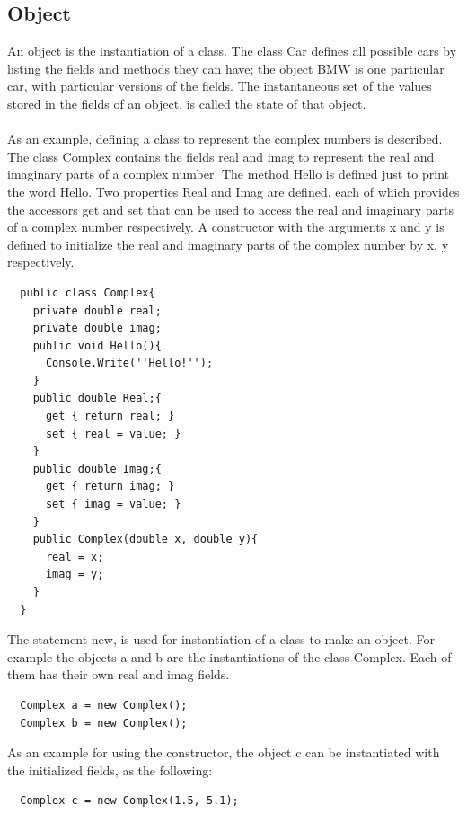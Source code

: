 \documentclass[11pt,twoside,a4paper]{fdyartcl}
\begin{document}
\subsection{Object}
An object is the instantiation of a class. The class {\scriptsize Car} defines all possible cars by listing the fields and methods they can have; the object {\scriptsize BMW} is one particular car, with particular versions of the fields. The instantaneous set of the values stored in the fields of an object, is called the state of that object.
\paragraph{}
As an example, defining a class to represent the complex numbers is described. The class {\scriptsize Complex} contains the fields {\scriptsize real} and {\scriptsize imag} to represent the real and imaginary parts of a complex number. The method {\scriptsize Hello} is defined just to print the word Hello. Two properties {\scriptsize Real} and {\scriptsize Imag} are defined, each of which provides the accessors {\scriptsize get} and {\scriptsize set} that can be used to access the real and imaginary parts of a complex number respectively. A constructor with the arguments {\scriptsize x} and {\scriptsize y} is defined to initialize the real and imaginary parts of the complex number by {\scriptsize x}, {\scriptsize y} respectively.
{\scriptsize \begin{verbatim}
  public class Complex{
    private double real;
    private double imag;
    public void Hello(){
      Console.Write(''Hello!'');
    }
    public double Real;{
      get { return real; }
      set { real = value; }
    }
    public double Imag;{
      get { return imag; }
      set { imag = value; }
    }
    public Complex(double x, double y){
      real = x;
      imag = y;
    }
  }
\end{verbatim}}
The statement {\scriptsize new}, is used for instantiation of a class to make an object. For example the objects {\scriptsize a} and {\scriptsize b} are the instantiations of the class {\scriptsize Complex}. Each of them has their own {\scriptsize real} and {\scriptsize imag} fields.
{\scriptsize \begin{verbatim}
  Complex a = new Complex();
  Complex b = new Complex();
\end{verbatim}}
As an example for using the constructor, the object {\scriptsize c} can be instantiated with the initialized fields, as the following:
{\scriptsize \begin{verbatim}
  Complex c = new Complex(1.5, 5.1);
\end{verbatim}}
\end{document}
